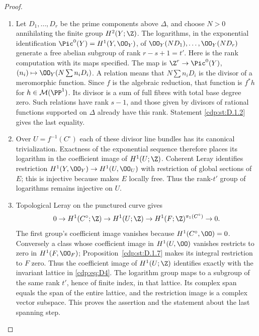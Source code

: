 \begin{proof}

\begin{enumerate}[leftmargin=*]
\item Let $D_1,\ldots,D_r$ be the prime components above $\Delta$, and
choose $N>0$ annihilating the finite group $H^2(Y;\Z)$.
The logarithms, in the exponential identification
$\Pic^0(Y)=H^1(Y,\OO_Y)$, of
$\OO_Y(ND_1),\ldots,\OO_Y(ND_r)$ generate a free abelian
subgroup of rank $r-s+1=t'$.
Here is the rank computation with its maps specified. The map is
$\Z^r\to\Pic^0(Y)$, $(n_i)\mapsto\OO_Y(N\sum n_iD_i)$.
A relation means that $N\sum n_iD_i$ is the divisor of a
meromorphic function. Since $f$ is the algebraic reduction, that
function is $f^*h$ for $h\in\mathcal M(\PP^1)$.
Its divisor is a sum of full fibres with total base degree zero.
Such relations have rank $s-1$, and those given by divisors of
rational functions supported on $\Delta$ already have this rank.
Statement \ref{cdp:st:D.1.2} gives the last equality.

\item Over $U=f^{-1}(C^\circ)$ each of these divisor line bundles has
its canonical trivialization. Exactness of the exponential sequence
therefore places its logarithm in the coefficient image of
$H^1(U;\Z)$. Coherent Leray identifies restriction
$H^1(Y,\OO_Y)\to H^1(U,\OO_U)$ with restriction of global
sections of $E$; this is injective because  makes $E$ locally free.
Thus the rank-$t'$ group of logarithms remains injective on $U$.

\item Topological Leray on the punctured curve gives
\[
0\to H^1(C^\circ;\Z)\to H^1(U;\Z)
\to H^1(F;\Z)^{\pi_1(C^\circ)}\to0.
\]
The first group's coefficient image vanishes because
$H^1(C^\circ,\OO)=0$. Conversely a class whose coefficient image
in $H^1(U,\OO)$ vanishes restricts to zero in $H^1(F,\OO_F)$;
Proposition~\ref{cdp:st:D.1.7} makes its integral restriction to $F$ zero. Thus the
coefficient image of $H^1(U;\Z)$ identifies exactly with the
invariant lattice in \eqref{cdp:eq:D4}. The logarithm group maps to a subgroup
of the same rank $t'$, hence of finite index, in that lattice.
Its complex span equals the span of the entire lattice, and the
restriction image is a complex vector subspace. This proves the
assertion and the statement about the last spanning step.

\end{enumerate}
\end{proof}